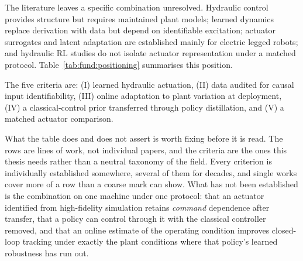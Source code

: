 The literature leaves a specific combination unresolved. Hydraulic control
provides structure but requires maintained plant models; learned dynamics
replace derivation with data but depend on identifiable excitation; actuator
surrogates and latent adaptation are established mainly for electric legged
robots; and hydraulic RL studies do not isolate actuator representation under
a matched protocol. Table~\ref{tab:fund:positioning} summarises this position.

The five criteria are: (I) learned hydraulic actuation, (II) data audited for
causal input identifiability, (III) online adaptation to plant variation at
deployment, (IV) a classical-control prior transferred through policy
distillation, and (V) a matched actuator comparison.

What the table does and does not assert is worth fixing before it is read. The
rows are lines of work, not individual papers, and the criteria are the ones
this thesis needs rather than a neutral taxonomy of the field. Every criterion
is individually established somewhere, several of them for decades, and single
works cover more of a row than a coarse mark can show. What has not been
established is the combination on one machine under one protocol: that an
actuator identified from high-fidelity simulation retains \emph{command}
dependence after transfer, that a policy can control through it with the
classical controller removed, and that an online estimate of the operating
condition improves closed-loop tracking under exactly the plant conditions
where that policy's learned robustness has run out.

